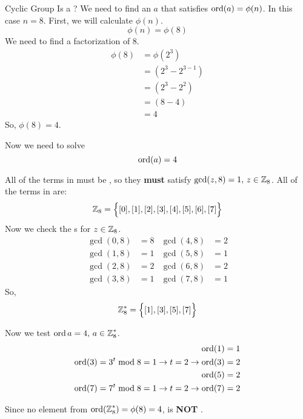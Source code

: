 \begin{example}{Cyclic Group}
  Is  a  ?
  \tcblower{}
    We need to find an $a$ that satisfies $\operatorname{\operatorname{ord}}(a) = \phi(n)$.
  In this case $n=8$.
  First, we will calculate $\phi(n)$.
  \begin{equation*}
    \phi(n) = \phi(8)
  \end{equation*}
  We need to find a  factorization of $8$.
  \begin{align*}
    \phi(8) &= \phi \left( 2^{3} \right) \\
            &= \left( 2^{3} - 2^{3-1} \right) \\
            &= \left( 2^{3} - 2^{2} \right) \\
            &= (8-4) \\
            &= 4
  \end{align*}
  So, $\phi(8) = 4$.

  Now we need to solve
  \begin{equation*}
    \operatorname{\operatorname{ord}} (a) = 4
  \end{equation*}

  All of the terms in  must be , so they \textbf{must} satisfy $\gcd(z, 8) = 1, \, z \in \operatorname{\mathbb{Z}}_{8}$.
  All of the terms in  are:
  \begin{equation*}
    \operatorname{\mathbb{Z}}_{8} = \Bigl\lbrace [0], [1], [2], [3], [4], [5], [6], [7] \Bigr\rbrace
  \end{equation*}
  Now we check the s for $z \in \operatorname{\mathbb{Z}}_{8}$.
  \begin{align*}
    \gcd(0, 8) &= 8 & \gcd(4, 8) &= 2 \\
    \gcd(1, 8) &= 1 & \gcd(5, 8) &= 1 \\
    \gcd(2, 8) &= 2 & \gcd(6, 8) &= 2 \\
    \gcd(3, 8) &= 1 & \gcd(7, 8) &= 1
  \end{align*}
  So,
  \begin{equation*}
    \operatorname{\mathbb{Z}}_{8}^{*} = \Bigl\lbrace [1], [3], [5], [7] \Bigr\rbrace
  \end{equation*}

  Now we test $\operatorname{\operatorname{ord}}{a} = 4, \, a \in \operatorname{\mathbb{Z}}_{8}^{*}$.
  \begin{align*}
    \operatorname{\operatorname{ord}}(1) &= 1 \\
    \operatorname{\operatorname{ord}}(3) = 3^{t} \bmod 8 = 1 \rightarrow t = 2 \rightarrow \operatorname{\operatorname{ord}}(3) &= 2 \\
    \operatorname{\operatorname{ord}}(5) &= 2 \\
    \operatorname{\operatorname{ord}}(7) = 7^{t} \bmod 8 = 1 \rightarrow t = 2 \rightarrow \operatorname{\operatorname{ord}}(7) &= 2
  \end{align*}

  Since no element from $\operatorname{\operatorname{ord}} (\operatorname{\mathbb{Z}}_{8}^{*}) = \phi(8) = 4$,  is \textbf{NOT} .
\end{example}

